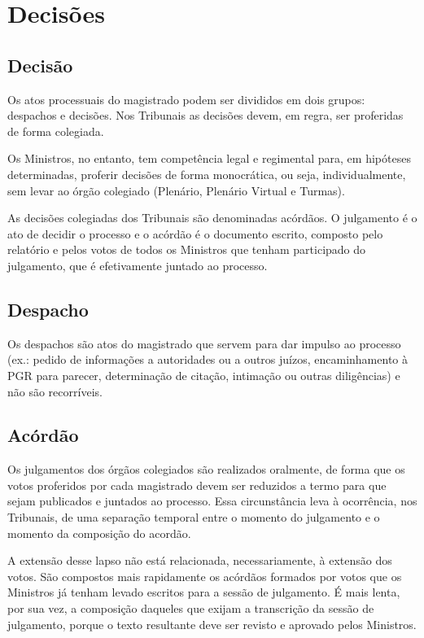 \documentclass[
]{book}
\begin{document}
\hypertarget{decisuxf5es}{%
\chapter{Decisões}\label{decisuxf5es}}

\hypertarget{decisuxe3o}{%
\section{Decisão}\label{decisuxe3o}}

Os atos processuais do magistrado podem ser divididos em dois grupos: despachos e decisões. Nos Tribunais as decisões devem, em regra, ser proferidas de forma colegiada.

Os Ministros, no entanto, tem competência legal e regimental para, em hipóteses determinadas, proferir decisões de forma monocrática, ou seja, individualmente, sem levar ao órgão colegiado (Plenário, Plenário Virtual e Turmas).

As decisões colegiadas dos Tribunais são denominadas acórdãos. O julgamento é o ato de decidir o processo e o acórdão é o documento escrito, composto pelo relatório e pelos votos de todos os Ministros que tenham participado do julgamento, que é efetivamente juntado ao processo.

\hypertarget{despacho}{%
\section{Despacho}\label{despacho}}

Os despachos são atos do magistrado que servem para dar impulso ao processo (ex.: pedido de informações a autoridades ou a outros juízos, encaminhamento à PGR para parecer, determinação de citação, intimação ou outras diligências) e não são recorríveis.

\hypertarget{acuxf3rduxe3o}{%
\section{Acórdão}\label{acuxf3rduxe3o}}

Os julgamentos dos órgãos colegiados são realizados oralmente, de forma que os votos proferidos por cada magistrado devem ser reduzidos a termo para que sejam publicados e juntados ao processo. Essa circunstância leva à ocorrência, nos Tribunais, de uma separação temporal entre o momento do julgamento e o momento da composição do acordão.

A extensão desse lapso não está relacionada, necessariamente, à extensão dos votos. São compostos mais rapidamente os acórdãos formados por votos que os Ministros já tenham levado escritos para a sessão de julgamento. É mais lenta, por sua vez, a composição daqueles que exijam a transcrição da sessão de julgamento, porque o texto resultante deve ser revisto e aprovado pelos Ministros.
\end{document}
